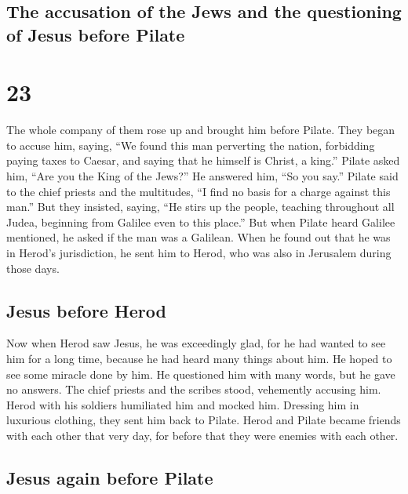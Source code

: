 \hypertarget{the-accusation-of-the-jews-and-the-questioning-of-jesus-before-pilate}{%
\subsection{The accusation of the Jews and the questioning of Jesus
before
Pilate}\label{the-accusation-of-the-jews-and-the-questioning-of-jesus-before-pilate}}

\hypertarget{section-13}{%
\section{23}\label{section-13}}

 The whole company of them rose up and brought him before
Pilate.  They began to accuse him, saying, ``We found this
man perverting the nation, forbidding paying taxes to Caesar, and saying
that he himself is Christ, a king.''  Pilate asked him,
``Are you the King of the Jews?'' He answered him, ``So you say.''
 Pilate said to the chief priests and the multitudes, ``I
find no basis for a charge against this man.''  But they
insisted, saying, ``He stirs up the people, teaching throughout all
Judea, beginning from Galilee even to this place.''  But
when Pilate heard Galilee mentioned, he asked if the man was a Galilean.
 When he found out that he was in Herod's jurisdiction, he
sent him to Herod, who was also in Jerusalem during those days.

\hypertarget{jesus-before-herod}{%
\subsection{Jesus before Herod}\label{jesus-before-herod}}

 Now when Herod saw Jesus, he was exceedingly glad, for he
had wanted to see him for a long time, because he had heard many things
about him. He hoped to see some miracle done by him.  He
questioned him with many words, but he gave no answers. 
The chief priests and the scribes stood, vehemently accusing him.
 Herod with his soldiers humiliated him and mocked him.
Dressing him in luxurious clothing, they sent him back to Pilate.
 Herod and Pilate became friends with each other that
very day, for before that they were enemies with each other.

\hypertarget{jesus-again-before-pilate}{%
\subsection{Jesus again before Pilate}\label{jesus-again-before-pilate}}

